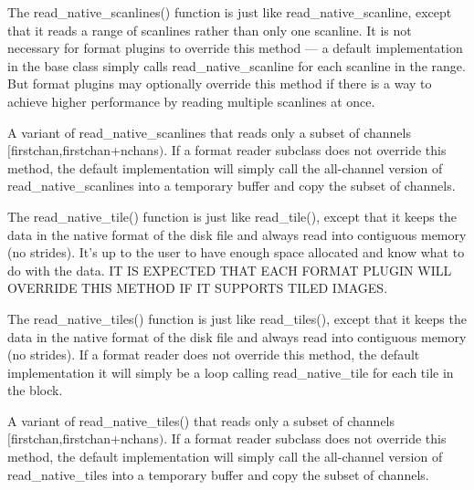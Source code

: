 The {\kw read_native_scanlines()} function is just like 
{\cf read_native_scanline}, except that it reads
a range of scanlines rather than only one scanline.  It is not necessary
for format plugins to override this method --- a default implementation
in the \ImageInput base class simply calls {\cf read_native_scanline}
for each scanline in the range.  But format plugins may optionally
override this method if there is a way to achieve higher performance by
reading multiple scanlines at once.
\apiend

A variant of {\cf read_native_scanlines} that reads only a subset of 
channels \\ $[${\cf firstchan},{\cf firstchan+nchans}$)$.  
If a format reader subclass does
not override this method, the default implementation will simply
call the all-channel version of {\cf read_native_scanlines} into a
temporary buffer and copy the subset of channels.
\apiend

The {\kw read_native_tile()} function is just like {\kw read_tile()}, 
except that it keeps the data in the native format of the disk file and
always read into contiguous memory (no strides).  It's up to the user to
have enough space allocated and know what to do with the data.  IT IS
EXPECTED THAT EACH FORMAT PLUGIN WILL OVERRIDE THIS METHOD IF IT
SUPPORTS TILED IMAGES.
\apiend

The {\kw read_native_tiles()} function is just like {\kw read_tiles()}, 
except that it keeps the data in the native format of the disk file and
always read into contiguous memory (no strides).  
If a format reader does not override this method, the default
implementation it will simply be a loop calling read_native_tile
for each tile in the block.
\apiend

A variant of {\kw read_native_tiles()} that reads only a subset of 
channels \\ $[${\cf firstchan},{\cf firstchan+nchans}$)$.  
If a format reader subclass does
not override this method, the default implementation will simply
call the all-channel version of {\cf read_native_tiles} into a
temporary buffer and copy the subset of channels.
\apiend

